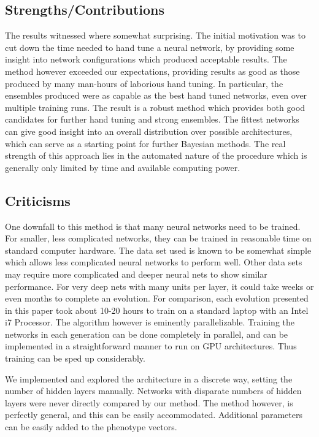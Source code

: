 \documentclass{article}
\DeclareMathOperator{\1}{\mathbbm{1}}
\begin{document}
\subsection{Strengths/Contributions}

The results witnessed where somewhat surprising. The initial motivation was to cut down the time needed to hand tune a neural network,
by providing some insight into network configurations which produced acceptable results. The method however exceeded our expectations, 
providing results as good as those produced by many man-hours of laborious hand tuning. In particular, the ensembles produced were as capable
as the best hand tuned networks, even over multiple training runs. The result is a robust method which provides both good candidates
for further hand tuning and strong ensembles. The fittest networks can give good insight
into an overall distribution over possible architectures, which can serve as a starting point for further Bayesian methods. The real strength
of this approach lies in the automated nature of the procedure which is generally only limited by time and available computing power.

\subsection{Criticisms}
One downfall to this method is that many neural networks need to be trained. For smaller, less complicated networks, they can be trained in
reasonable time on standard computer hardware. The data set used is known to be somewhat simple which allows less 
complicated neural networks to perform well. Other data sets may require more complicated and deeper neural nets to show
similar performance. For very deep nets with many units per layer, it could take weeks or even
months to complete an evolution. For comparison, each evolution presented in this paper took about 10-20 hours to
train on a standard laptop with an Intel i7 Processor. The algorithm however is eminently parallelizable. Training the networks 
in each generation can be done completely in parallel, and can be implemented in a straightforward manner to run on GPU architectures.
Thus training can be sped up considerably. 

We implemented and explored the architecture in a discrete way, setting the number of hidden layers manually. Networks with disparate 
numbers of hidden layers were never directly compared by our method. The method however, is perfectly general, and this can be easily accommodated.
Additional parameters can be easily added to the phenotype vectors. 
\end{document}
